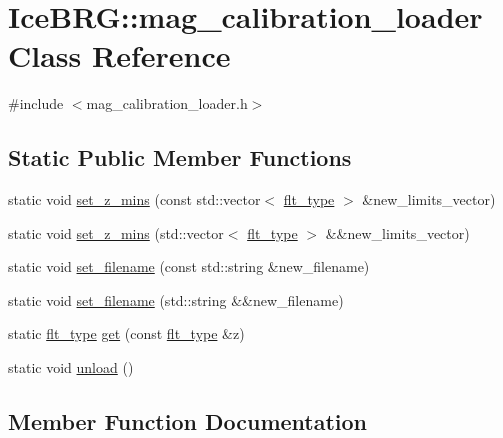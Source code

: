 \hypertarget{classIceBRG_1_1mag__calibration__loader}{}\section{Ice\+B\+R\+G\+:\+:mag\+\_\+calibration\+\_\+loader Class Reference}
\label{classIceBRG_1_1mag__calibration__loader}


{\ttfamily \#include $<$mag\+\_\+calibration\+\_\+loader.\+h$>$}

\subsection*{Static Public Member Functions}
\begin{DoxyCompactItemize}
\item 
static void \hyperlink{classIceBRG_1_1mag__calibration__loader_af276f91edf2a3a40189983c705092c37}{set\+\_\+z\+\_\+mins} (const std\+::vector$<$ \hyperlink{lib_2IceBRG__main_2common_8h_ad0f130a56eeb944d9ef2692ee881ecc4}{flt\+\_\+type} $>$ \&new\+\_\+limits\+\_\+vector)
\item 
static void \hyperlink{classIceBRG_1_1mag__calibration__loader_ace15d6820dfc88c0501c0b1a8cfdd32f}{set\+\_\+z\+\_\+mins} (std\+::vector$<$ \hyperlink{lib_2IceBRG__main_2common_8h_ad0f130a56eeb944d9ef2692ee881ecc4}{flt\+\_\+type} $>$ \&\&new\+\_\+limits\+\_\+vector)
\item 
static void \hyperlink{classIceBRG_1_1mag__calibration__loader_a6d8f09bdfb5a75ed3d25370bda3ca545}{set\+\_\+filename} (const std\+::string \&new\+\_\+filename)
\item 
static void \hyperlink{classIceBRG_1_1mag__calibration__loader_ad79c4c5eb6ccab5d2212bfe77633e03a}{set\+\_\+filename} (std\+::string \&\&new\+\_\+filename)
\item 
static \hyperlink{lib_2IceBRG__main_2common_8h_ad0f130a56eeb944d9ef2692ee881ecc4}{flt\+\_\+type} \hyperlink{classIceBRG_1_1mag__calibration__loader_a2e1d2ff7d05458a304ceb7f993448aa7}{get} (const \hyperlink{lib_2IceBRG__main_2common_8h_ad0f130a56eeb944d9ef2692ee881ecc4}{flt\+\_\+type} \&z)
\item 
static void \hyperlink{classIceBRG_1_1mag__calibration__loader_a71a4df8564cc427b21b3583ebd58b15d}{unload} ()
\end{DoxyCompactItemize}


\subsection{Member Function Documentation}
\hypertarget{classIceBRG_1_1mag__calibration__loader_a2e1d2ff7d05458a304ceb7f993448aa7}{}

